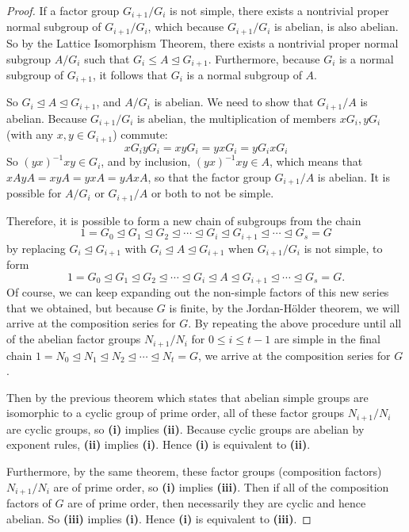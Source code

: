 \documentclass[11pt]{article}
\begin{document}
\begin{enumerate}
\begin{proof}
      If a factor group $G_{i+1}/G_i$ is not simple, there exists a nontrivial proper normal subgroup of $G_{i+1}/G_i$, which because $G_{i+1}/G_i$ is abelian, is also abelian. So by the Lattice Isomorphism Theorem, there exists a nontrivial proper normal subgroup $A/G_i$ such that $G_i\leq A \unlhd G_{i+1}$. Furthermore, because $G_i$ is a normal subgroup of $G_{i+1}$, it follows that $G_i$ is a normal subgroup of $A$.
      
      So $G_i\unlhd A \unlhd G_{i+1}$, and $A/G_i$ is abelian. We need to show that $G_{i+1}/A$ is abelian. Because $G_{i+1}/G_i$ is abelian, the multiplication of members $xG_i,yG_i$ (with any $x,y\in G_{i+1}$) commute:
      \[xG_iyG_i = xyG_i = yxG_i = yG_ixG_i\]
      So $(yx)^{-1}xy\in G_i$, and by inclusion, $(yx)^{-1}xy\in A$, which means that $xAyA = xyA = yxA = yAxA$, so that the factor group $G_{i+1}/A$ is abelian. It is possible for $A/G_i$ or $G_{i+1}/A$ or both to not be simple.

      Therefore, it is possible to form a new chain of subgroups from the chain \[1 = G_0 \unlhd G_1 \unlhd G_2 \unlhd \cdots \unlhd G_i \unlhd G_{i+1} \unlhd \cdots \unlhd G_s = G\] by replacing $G_i \unlhd G_{i+1}$ with $G_i\unlhd A \unlhd G_{i+1}$ when $G_{i+1}/G_i$ is not simple, to form \[1 = G_0 \unlhd G_1 \unlhd G_2 \unlhd \cdots \unlhd G_i\unlhd A \unlhd G_{i+1} \unlhd \cdots \unlhd G_s = G.\] Of course, we can keep expanding out the non-simple factors of this new series that we obtained, but because $G$ is finite, by the Jordan-H\"older theorem, we will arrive at the composition series for $G$. By repeating the above procedure until all of the abelian factor groups $N_{i+1}/N_i$ for $0\leq i\leq t-1$ are simple in the final chain $1 = N_0 \unlhd N_1 \unlhd N_2 \unlhd \cdots \unlhd N_t = G$, we arrive at the composition series for $G$.

      Then by the previous theorem which states that abelian simple groups are isomorphic to a cyclic group of prime order, all of these factor groups $N_{i+1}/N_i$ are cyclic groups, so \textbf{(i)} implies \textbf{(ii)}. Because cyclic groups are abelian by exponent rules, \textbf{(ii)} implies \textbf{(i)}. Hence \textbf{(i)} is equivalent to \textbf{(ii)}.

      Furthermore, by the same theorem, these factor groups (composition factors) $N_{i+1}/N_i$ are of prime order, so \textbf{(i)} implies \textbf{(iii)}. Then if all of the composition factors of $G$ are of prime order, then necessarily they are cyclic and hence abelian. So \textbf{(iii)} implies \textbf{(i)}. Hence \textbf{(i)} is equivalent to \textbf{(iii)}.


\end{proof}
\end{enumerate}
\end{document}
